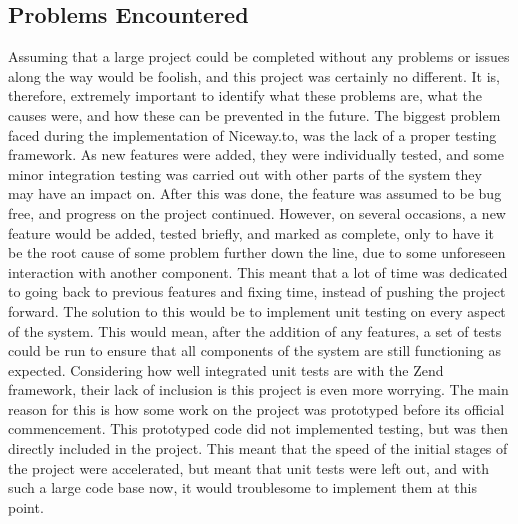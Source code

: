 \subsection{Problems Encountered}
Assuming that a large project could be completed without any problems or issues along the way would be foolish, and this project was certainly no different. It is, therefore, extremely important to identify what these problems are, what the causes were, and how these can be prevented in the future. The biggest problem faced during the implementation of Niceway.to, was the lack of a proper testing framework. As new features were added, they were individually tested, and some minor integration testing was carried out with other parts of the system they may have an impact on. After this was done, the feature was assumed to be bug free, and progress on the project continued. However, on several occasions, a new feature would be added, tested briefly, and marked as complete, only to have it be the root cause of some problem further down the line, due to some unforeseen interaction with another component. This meant that a lot of time was dedicated to going back to previous features and fixing time, instead of pushing the project forward. The solution to this would be to implement unit testing on every aspect of the system. This would mean, after the addition of any features, a set of tests could be run to ensure that all components of the system are still functioning as expected. Considering how well integrated unit tests are with the Zend framework, their lack of inclusion is this project is even more worrying. The main reason for this is how some work on the project was prototyped before its official commencement. This prototyped code did not implemented testing, but was then directly included in the project. This meant that the speed of the initial stages of the project were accelerated, but meant that unit tests were left out, and with such a large code base now, it would troublesome to implement them at this point.\ \\
\ \\
